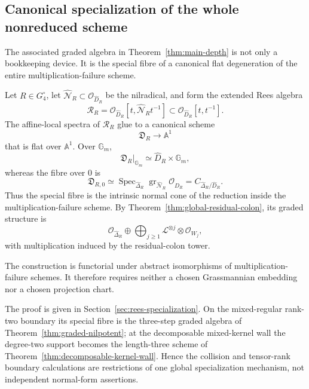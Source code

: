 \subsection*{Canonical specialization of the whole nonreduced scheme}

The associated graded algebra in Theorem~\ref{thm:main-depth} is not
only a bookkeeping device. It is the special fibre of a canonical
flat degeneration of the entire multiplication-failure scheme.

\begin{theorem}
\label{thm:canonical-rees-specialization}
Let \(R\in G_4^\circ\), let
\(\widehat{\mathcal N}_R\subset\mathcal O_{\widehat D_R}\)
be the nilradical, and form the extended Rees algebra
\[
 \mathscr R_R
 =
 \mathcal O_{\widehat D_R}
 [t,\widehat{\mathcal N}_R t^{-1}]
 \subset
 \mathcal O_{\widehat D_R}[t,t^{-1}].
\]
The affine-local spectra of \(\mathscr R_R\) glue to a canonical
scheme
\[
 \mathfrak D_R\longrightarrow\mathbb A^1
\]
that is flat over \(\mathbb A^1\). Over \(\mathbb G_m\),
\[
 \mathfrak D_R|_{\mathbb G_m}
 \simeq
 \widehat D_R\times\mathbb G_m,
\]
whereas the fibre over \(0\) is
\[
 \mathfrak D_{R,0}
 \simeq
 \operatorname{Spec}_{\widehat\Delta_R}
 \operatorname{gr}_{\widehat{\mathcal N}_R}
 \mathcal O_{\widehat D_R}
 =
 C_{\widehat\Delta_R/\widehat D_R}.
\]
Thus the special fibre is the intrinsic normal cone of the reduction
inside the multiplication-failure scheme. By
Theorem~\ref{thm:global-residual-colon}, its graded structure is
\[
 \mathcal O_{\widehat\Delta_R}
 \oplus
 \bigoplus_{j\ge1}
 \mathcal L^{\otimes j}\otimes\mathcal O_{W_j},
\]
with multiplication induced by the residual-colon tower.

The construction is functorial under abstract isomorphisms of
multiplication-failure schemes. It therefore requires neither a
chosen Grassmannian embedding nor a chosen projection chart.
\end{theorem}

The proof is given in Section~\ref{sec:rees-specialization}. On the
mixed-regular rank-two boundary its special fibre is the three-step
graded algebra of Theorem~\ref{thm:graded-nilpotent}; at the
decomposable mixed-kernel wall the degree-two support becomes the
length-three scheme of Theorem~\ref{thm:decomposable-kernel-wall}.
Hence the collision and tensor-rank boundary calculations are
restrictions of one global specialization mechanism, not independent
normal-form assertions.

